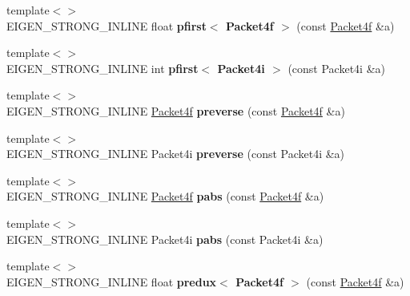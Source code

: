 \begin{DoxyCompactItemize}
{\footnotesize template$<$$>$ }\\E\+I\+G\+E\+N\+\_\+\+S\+T\+R\+O\+N\+G\+\_\+\+I\+N\+L\+I\+NE float {\bfseries pfirst$<$ Packet4f $>$} (const \hyperlink{struct_eigen_1_1internal_1_1_packet4f}{Packet4f} \&a)
\item 
\mbox{\label{namespace_eigen_1_1internal_ac2a33e6980023c110d8a3e5c6ae91816}} 
{\footnotesize template$<$$>$ }\\E\+I\+G\+E\+N\+\_\+\+S\+T\+R\+O\+N\+G\+\_\+\+I\+N\+L\+I\+NE int {\bfseries pfirst$<$ Packet4i $>$} (const Packet4i \&a)
\item 
\mbox{\label{namespace_eigen_1_1internal_ab6feb0f00213b7e4222460244653db67}} 
{\footnotesize template$<$$>$ }\\E\+I\+G\+E\+N\+\_\+\+S\+T\+R\+O\+N\+G\+\_\+\+I\+N\+L\+I\+NE \hyperlink{struct_eigen_1_1internal_1_1_packet4f}{Packet4f} {\bfseries preverse} (const \hyperlink{struct_eigen_1_1internal_1_1_packet4f}{Packet4f} \&a)
\item 
\mbox{\label{namespace_eigen_1_1internal_a2985360923239d7ae8237408c4a39e6b}} 
{\footnotesize template$<$$>$ }\\E\+I\+G\+E\+N\+\_\+\+S\+T\+R\+O\+N\+G\+\_\+\+I\+N\+L\+I\+NE Packet4i {\bfseries preverse} (const Packet4i \&a)
\item 
\mbox{\label{namespace_eigen_1_1internal_a9fdd6f0bbf0e65f4b7f1d47a7b9e76c0}} 
{\footnotesize template$<$$>$ }\\E\+I\+G\+E\+N\+\_\+\+S\+T\+R\+O\+N\+G\+\_\+\+I\+N\+L\+I\+NE \hyperlink{struct_eigen_1_1internal_1_1_packet4f}{Packet4f} {\bfseries pabs} (const \hyperlink{struct_eigen_1_1internal_1_1_packet4f}{Packet4f} \&a)
\item 
\mbox{\label{namespace_eigen_1_1internal_a6c2f185b35a5c0ff18e39c00e0e00efc}} 
{\footnotesize template$<$$>$ }\\E\+I\+G\+E\+N\+\_\+\+S\+T\+R\+O\+N\+G\+\_\+\+I\+N\+L\+I\+NE Packet4i {\bfseries pabs} (const Packet4i \&a)
\item 
\mbox{\label{namespace_eigen_1_1internal_ac452fae35fa261d87c7c36b3fd50b6ca}} 
{\footnotesize template$<$$>$ }\\E\+I\+G\+E\+N\+\_\+\+S\+T\+R\+O\+N\+G\+\_\+\+I\+N\+L\+I\+NE float {\bfseries predux$<$ Packet4f $>$} (const \hyperlink{struct_eigen_1_1internal_1_1_packet4f}{Packet4f} \&a)

\end{DoxyCompactItemize}
